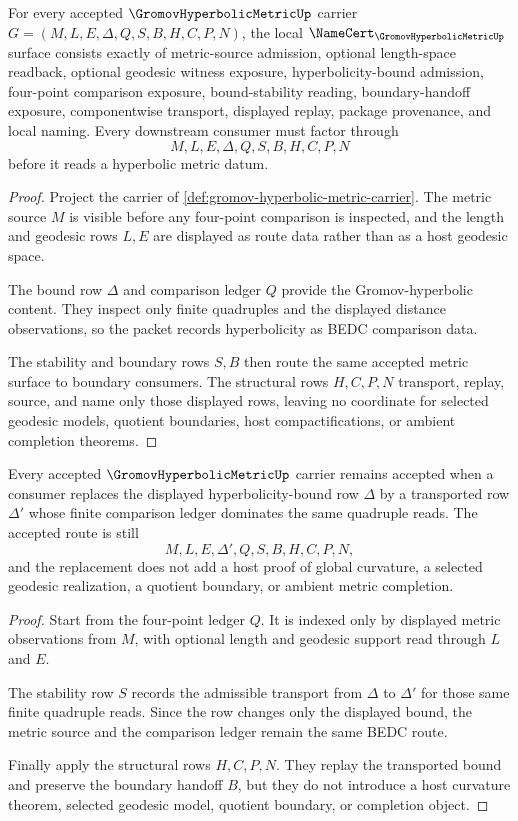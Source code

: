 \begin{theorem}
\label{thm:gromov-hyperbolic-metric-namecert-obligations}
For every accepted $\GromovHyperbolicMetricUp$ carrier $G=(M,L,E,\Delta,Q,S,B,H,C,P,N)$, the local $\NameCert_{\GromovHyperbolicMetricUp}$ surface consists exactly of metric-source admission, optional length-space readback, optional geodesic witness exposure, hyperbolicity-bound admission, four-point comparison exposure, bound-stability reading, boundary-handoff exposure, componentwise transport, displayed replay, package provenance, and local naming. Every downstream consumer must factor through
$$
M,L,E,\Delta,Q,S,B,H,C,P,N
$$
before it reads a hyperbolic metric datum.
\end{theorem}
\begin{proof}
Project the carrier of \autoref{def:gromov-hyperbolic-metric-carrier}. The metric source $M$ is visible before any four-point comparison is inspected, and the length and geodesic rows $L,E$ are displayed as route data rather than as a host geodesic space.

The bound row $\Delta$ and comparison ledger $Q$ provide the Gromov-hyperbolic content. They inspect only finite quadruples and the displayed distance observations, so the packet records hyperbolicity as BEDC comparison data.

The stability and boundary rows $S,B$ then route the same accepted metric surface to boundary consumers. The structural rows $H,C,P,N$ transport, replay, source, and name only those displayed rows, leaving no coordinate for selected geodesic models, quotient boundaries, host compactifications, or ambient completion theorems.
\end{proof}

\begin{theorem}
\label{thm:gromov-hyperbolic-metric-four-point-stability}
Every accepted $\GromovHyperbolicMetricUp$ carrier remains accepted when a consumer replaces the displayed hyperbolicity-bound row $\Delta$ by a transported row $\Delta'$ whose finite comparison ledger dominates the same quadruple reads. The accepted route is still
$$
M,L,E,\Delta',Q,S,B,H,C,P,N,
$$
and the replacement does not add a host proof of global curvature, a selected geodesic realization, a quotient boundary, or ambient metric completion.
\end{theorem}
\begin{proof}
Start from the four-point ledger $Q$. It is indexed only by displayed metric observations from $M$, with optional length and geodesic support read through $L$ and $E$.

The stability row $S$ records the admissible transport from $\Delta$ to $\Delta'$ for those same finite quadruple reads. Since the row changes only the displayed bound, the metric source and the comparison ledger remain the same BEDC route.

Finally apply the structural rows $H,C,P,N$. They replay the transported bound and preserve the boundary handoff $B$, but they do not introduce a host curvature theorem, selected geodesic model, quotient boundary, or completion object.
\end{proof}

